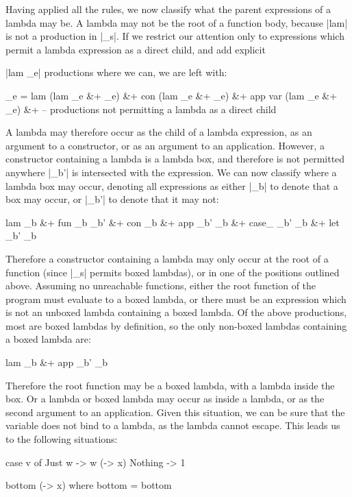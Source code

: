 \documentclass[preprint]{sigplanconf}
\begin{document}
Having applied all the rules, we now classify what the parent expressions of a lambda may be. A lambda may not be the root of a function body, because |lam| is not a production in |_s|. If we restrict our attention only to expressions which permit a lambda expression as a direct child, and add explicit \ignore|lam _e| productions where we can, we are left with:

\ignore\begin{code}
_e =  lam (lam _e &+ _e) &+ con (lam _e &+ _e) &+ app var (lam _e &+ _e) &+
      -- productions not permitting a lambda as a direct child
\end{code}

A lambda may therefore occur as the child of a lambda expression, as an argument to a constructor, or as an argument to an application. However, a constructor containing a lambda is a lambda box, and therefore is not permitted anywhere |_b'| is intersected with the expression. We can now classify where a lambda box may occur, denoting all expressions as either |_b| to denote that a box may occur, or |_b'| to denote that it may not:

\ignore\begin{code}
lam _b &+ fun _b _b' &+ con _b &+ app _b' _b &+ case_ _b' _b &+ let _b' _b
\end{code}

Therefore a constructor containing a lambda may only occur at the root of a function (since |_s| permits boxed lambdas), or in one of the positions outlined above. Assuming no unreachable functions, either the root function of the program must evaluate to a boxed lambda, or there must be an expression which is not an unboxed lambda containing a boxed lambda. Of the above productions, most are boxed lambdas by definition, so the only non-boxed lambdas containing a boxed lambda are:

\ignore\begin{code}
lam _b &+ app _b' _b
\end{code}

Therefore the root function may be a boxed lambda, with a lambda inside the box. Or a lambda or boxed lambda may occur as inside a lambda, or as the second argument to an application. Given this situation, we can be sure that the variable does not bind to a lambda, as the lambda cannot escape. This leads us to the following situations:

\ignore\begin{code}
case v of
    Just w -> w (\x -> x)
    Nothing -> 1

bottom (\x -> x)
    where bottom = bottom
\end{code}
\end{document}
